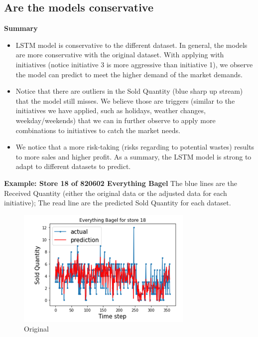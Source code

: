 \subsection{Are the models conservative\?}
\textbf{Summary}
\begin{itemize}
    \item LSTM model is conservative to the different dataset. In general, the models are more conservative with the original dataset. With applying with initiatives (notice initiative 3 is more aggressive than initiative 1), we observe the model can predict to meet the higher demand of the market demands. 
    
\item Notice that there are outliers in the Sold Quantity (blue sharp up stream) that the model still misses. We believe those are triggers (similar to the initiatives we have applied, such as holidays, weather changes, weekday/weekends) that we can in further observe to apply more combinations to initiatives to catch the market needs.

\item We notice that a more risk-taking (risks regarding to potential wastes) results to more sales and higher profit. As a summary, the LSTM model is strong to adapt to different datasets to predict.

\end{itemize}

\textbf{Example: Store 18 of 820602 Everything Bagel }
The blue lines are the Received Quantity (either the original data or the adjusted data for each initiative); The read line are the predicted Sold Quantity for each dataset.

\begin{figure}[ht]
    \centering
    \includegraphics[width = 0.6\linewidth]{figures/section4.png}
    \caption{Original }
\end{figure}

